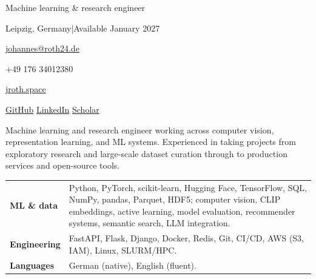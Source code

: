 \documentclass[10pt,a4paper]{article}
\newcommand{\sectiontitle}[1]{\par\vspace{13pt}{\fontsize{12}{14}\selectfont\bfseries\color{accent}#1}\par\vspace{4pt}{\color{rulegray}\hrule height 0.4pt}\vspace{6pt}}
\begin{document}
\color{ink}\fontsize{10.3}{13.2}\selectfont\RaggedRight
{}
\begin{minipage}[t]{0.56\linewidth}
\par\vspace{5pt}
{\fontsize{11.5}{14}\selectfont Machine learning \& research engineer}\par\vspace{4pt}
{\fontsize{9}{11.5}\selectfont\color{muted}Leipzig, Germany\quad |\quad Available January 2027}
\end{minipage}\hfill
\begin{minipage}[t]{0.40\linewidth}
\vspace{2pt}\raggedleft\fontsize{9}{12}\selectfont
\href{mailto:johannes@roth24.de}{johannes@roth24.de}\par
+49 176 34012380\par
\href{https://jroth.space}{jroth.space}\par\vspace{2pt}
\href{https://github.com/andropar}{GitHub}\quad
\href{https://linkedin.com/in/johannes-roth-a67baa141}{LinkedIn}\quad
\href{https://scholar.google.com/citations?user=U3Z3J2gAAAAJ}{Scholar}
\end{minipage}
\par{}\vspace{9pt}
Machine learning and research engineer working across computer vision, representation learning, and ML systems. Experienced in taking projects from exploratory research and large-scale dataset curation through to production services and open-source tools.

\sectiontitle{Technical skills}
\begin{tabularx}{\linewidth}{@{}>{\bfseries}p{29mm}>{\RaggedRight\arraybackslash}X@{}}
ML \& data & Python, PyTorch, scikit-learn, Hugging Face, TensorFlow, SQL, NumPy, pandas, Parquet, HDF5; computer vision, CLIP embeddings, active learning, model evaluation, recommender systems, semantic search, LLM integration.\\[4pt]
Engineering & FastAPI, Flask, Django, Docker, Redis, Git, CI/CD, AWS (S3, IAM), Linux, SLURM/HPC.\\[4pt]
Languages & German (native), English (fluent).
\end{tabularx}
\end{document}
